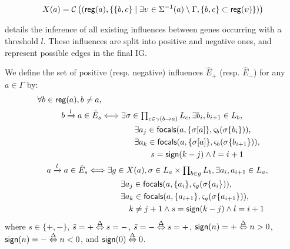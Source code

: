 \begin{equation}
X(a) = \mathcal C\left( (\mathsf{reg}({a}), \{ \{b,c\} \mid
				\exists \upsilon\in \Sigma^{-1}(a) \setminus \Gamma,
					\{b,c\} \subset \mathsf{reg}({\upsilon}) \}) \right)
\label{eq:influence-groups}
\end{equation}

 details the inference of all existing influences between genes occurring
with a threshold $l$.
These influences are split into positive and negative ones, and represent possible edges in the final IG.
\begin{proposition}\label{pps:inference-edges}
We define the set of positive (resp. negative) influences $\hat{E}_+$ (resp. $\hat{E}_-$) for any
$a\in\Gamma$ by:
\begin{align}
\begin{split}
\forall b\in\mathsf{reg}({a}), b\neq a, \\
b\xrightarrow l a \in \hat{E}_s & \Longleftrightarrow
 \exists \sigma\in\textstyle\prod_{c\in\gamma(b\rightarrow a)} L_c, \exists b_i,b_{i+1}\in L_b,\\
& \qquad\qquad
        \exists a_{j}\in\mathsf{focals}(a, \{\sigma[a]\}, \varsigma_b(\sigma\{b_i\})), \\
& \qquad\qquad
        \exists a_{k}\in\mathsf{focals}(a, \{\sigma[a]\}, \varsigma_b(\sigma\{b_{i+1}\})), \\
& \qquad\qquad\qquad
                        s = \mathsf{sign}(k - j) \wedge l = i+1
\end{split}
\label{eq:edges-inference-b}
\\
\begin{split}
a \xrightarrow l a \in \hat{E}_s & \Longleftrightarrow
\exists g \in X(a), \sigma \in L_a\times \textstyle\prod_{b\in g} L_b,
			\exists a_i,a_{i+1}\in L_a, \\
& \qquad\qquad
        \exists a_{j}\in\mathsf{focals}(a, \{a_i\}, \varsigma_g(\sigma\{a_i\})), \\
& \qquad\qquad
        \exists a_{k}\in\mathsf{focals}(a, \{a_{i+1}\},  \varsigma_g(\sigma\{a_{i+1}\})), \\
& \qquad\qquad\quad
			k \neq j+1
				\wedge s = \mathsf{sign}(k - j) \wedge l = i+1
\end{split}
\label{eq:edges-inference-a}
\end{align}
where $s \in \{ +, - \}$, $\bar s = + \stackrel{\Delta}\Leftrightarrow s = -$, $\bar s = - \stackrel{\Delta}\Leftrightarrow s = +$,
$\mathsf{sign}(n) = + \stackrel{\Delta}\Leftrightarrow n > 0$,
$\mathsf{sign}(n) = - \stackrel{\Delta}\Leftrightarrow n < 0$,
and $\mathsf{sign}(0) \stackrel{\Delta}\Leftrightarrow 0$.
\end{proposition}

